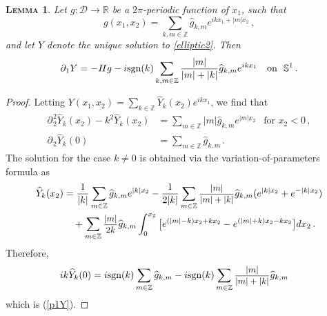 \documentclass[11pt]{article}
\theoremstyle{plain}
\newtheorem{lemma}[theorem]{\scshape Lemma}
\theoremstyle{definition}
\theoremstyle{definition}
\def\bbR{{\mathbb R}}
\def\bbZ{{\mathbb Z}}
\def\D{{\mathcal D}}
\def\p{\text{\bf\emph{p}}}
\def\ft #1{{\widehat{#1}}}
\def\p{{\partial\hspace{1pt}}}
\def\smallexp#1{{\text{\small #1}}}
\def\dfrac#1#2{\smallexp{$\displaystyle{}\frac{#1}{#2}$}}
\begin{document}
\begin{lemma}\label{lem:p1Y}
Let $g:\D\to \bbR$ be a $2\pi$-periodic function of $x_1$, such that
$$
g(x_1,x_2) = \sum_{k,m \in\bbZ} \ft{g}_{k,m} e^{ikx_1 + |m|x_2}\,,
$$
and let $Y$ denote the unique solution to \eqref{elliptic2}.
Then
\begin{equation}\label{p1Y}
\p_{\!1} Y = - H g - i \text{\rm sgn}(k) \sum_{k,m\in\bbZ} \frac{|m|}{|m|+|k|} \ft{g}_{k,m} e^{ikx_1 } \quad\text{on }\ \mathbb{S}^1\,.
\end{equation}
\end{lemma}
\begin{proof}
Letting $Y(x_1,x_2) = \sum\limits_{k\in\bbZ} \ft{Y}_k(x_2) e^{ikx_1}$, we find that
\begin{align*}
\p_{\!2}^2 \ft{Y}_k(x_2) - k^2 \ft{Y}_k(x_2) &= \sum_{m\in\bbZ} |m| \ft{g}_{k,m} e^{|m|x_2} \ \ \text{ for } x_2 < 0\,,\\
\p_{\!2} \ft{Y}_k(0) &= \sum_{m \in\bbZ} \ft{g}_{k,m}\,.
\end{align*}
The solution for the case $k\ne 0$ is obtained via the variation-of-parameters formula as
\begin{align*}
\ft{Y}_k(x_2) &= \frac{1}{|k|} \sum_{m \in\bbZ} \ft{g}_{k,m} e^{|k|x_2} - \frac{1}{2|k|} \sum_{m\in\bbZ} \dfrac{|m|}{|m|+|k|} \ft{g}_{k,m} (e^{|k|x_2} + e^{-|k|x_2}) \\
&\quad + \sum_{m\in\bbZ} \dfrac{|m|}{2k} \ft{g}_{k,m} \int_0^{x_2} \big[e^{(|m|-k)x_2 + kx_2} - e^{(|m|+k)x_2-kx_2}\big] dx_2\,.
\end{align*}
Therefore,
\begin{align*}
ik \ft{Y}_k(0) &= i \text{\rm sgn}(k) \sum_{m \in\bbZ} \ft{g}_{k,m} - i \text{\rm sgn}(k) \sum_{m\in\bbZ} \dfrac{|m|}{|m|+|k|} \ft{g}_{k,m}
\end{align*}
which is (\ref{p1Y}).
\end{proof}
\end{document}
